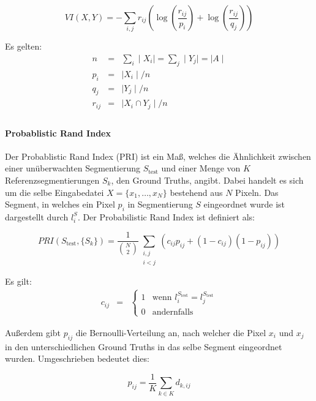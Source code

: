 \begin{equation}
VI(X, Y) = -\sum_{i, j} r_{ij}\left(\log\left(\frac{r_{ij}}{p_i}\right)+\log\left(\frac{r_{ij}}{q_j}\right)\right)
\end{equation}

Es gelten:
\begin{eqnarray}
n&=&\sum_i\mid X_i\mid=\sum_j \mid Y_j\mid=\mid A\mid\\
p_i&=&\mid X_i\mid/n\\
q_j&=&\mid Y_j\mid/n\\
r_{ij}&=&\mid X_i\cap Y_j\mid/n\\
\end{eqnarray}

\paragraph{Probablistic Rand Index}

Der Probablistic Rand Index (PRI) ist ein Maß, welches die Ähnlichkeit zwischen einer unüberwachten Segmentierung $S_\text{test}$ und einer Menge von $K$ Referenzsegmentierungen $S_k$, den Ground Truths, angibt. Dabei handelt es sich um die selbe Eingabedatei $X=\{x_1,\ldots,x_N\}$ bestehend aus $N$ Pixeln. Das Segment, in welches ein Pixel $p_i$ in Segmentierung $S$ eingeordnet wurde ist dargestellt durch $l_i^S$. Der Probabilistic Rand Index ist definiert als: \cite{pantofaru_07}

\begin{equation}
\label{eqn:pri1}
PRI(S_\text{test}, \{S_k\}) = \frac{1}{\binom{N}{2}} \sum_{\substack{i,j\\i<j}} \left(c_{ij}p_{ij}+\left(1-c_{ij}\right)\left(1-p_{ij}\right)\right)
\end{equation}

Es gilt:
\begin{eqnarray}
c_{ij}&=&\begin{cases}
1 & \text{wenn } l_i^{S_\text{test}}=l_j^{S_\text{test}}\\
0 & \text{andernfalls}
\end{cases}
\end{eqnarray}

Außerdem gibt $p_{ij}$ die Bernoulli-Verteilung an, nach welcher die Pixel $x_i$ und $x_j$ in den unterschiedlichen Ground Truths in das selbe Segment eingeordnet wurden. Umgeschrieben bedeutet dies:

\begin{equation}
p_{ij} = \frac{1}{K}\sum_{k\in K}d_{k, ij}
\end{equation}

